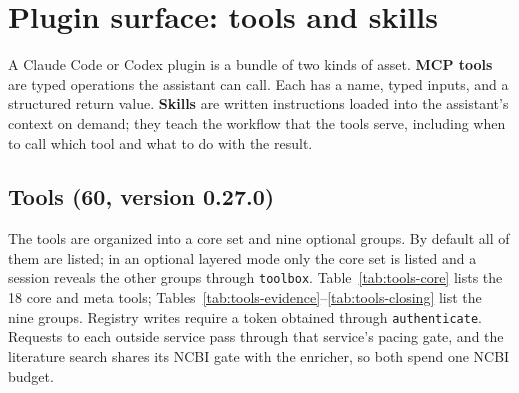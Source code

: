 \documentclass[11pt,a4paper]{article}
\begin{document}
\section{Plugin surface: tools and skills}
\label{app:tools}

A Claude Code or Codex plugin is a bundle of two kinds of asset. \textbf{MCP
tools} are typed operations the assistant can call. Each has a name, typed
inputs, and a structured return value. \textbf{Skills} are written
instructions loaded into the assistant's context on demand; they teach the
workflow that the tools serve, including when to call which tool and what to
do with the result.

\subsection*{Tools (60, version 0.27.0)}

The tools are organized into a core set and nine optional groups. By
default all of them are listed; in an optional layered mode only the core set
is listed and a session reveals the other groups through \texttt{toolbox}.
Table~\ref{tab:tools-core} lists the 18 core and meta tools;
Tables~\ref{tab:tools-evidence}--\ref{tab:tools-closing} list the nine
groups. Registry writes require a token obtained through
\texttt{authenticate}. Requests to each outside service pass
through that service's pacing gate, and the literature search shares its NCBI
gate with the enricher, so both spend one NCBI budget.
\end{document}
